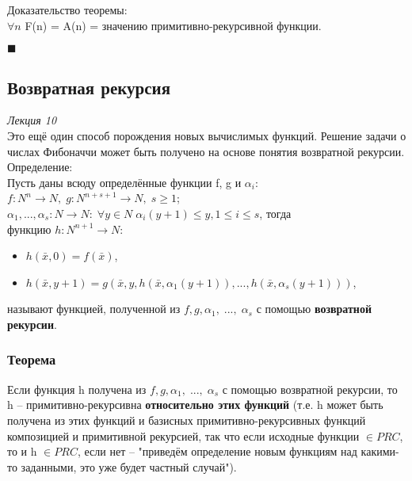         Доказательство теоремы:\\
        $\forall n$ F(n) = A(n) = значению примитивно-рекурсивной функции.
        \begin{flushright}
            $\blacksquare$\\
        \end{flushright}
        
        
    \subsection{Возвратная рекурсия}
    \emph{Лекция 10}\\
    
        Это ещё один способ порождения новых вычислимых функций. Решение задачи о числах Фибоначчи может быть получено на основе понятия возвратной рекурсии.\\
        
        Определение:\\
        Пусть даны всюду определённые функции f, g и $\alpha_{i}$:\\
        $f: N^{n} \rightarrow N,\; g: N^{n+s+1} \rightarrow N,\; s \geq 1$;\\
        $\alpha_1, ... , \alpha_s: N \rightarrow N:\; \forall y \in N \; \alpha_i (y + 1) \leq y, 1 \leq i \leq s$, тогда\\
        функцию $h: N^{n+1} \rightarrow N:$\\
        \begin{itemize}
            \item $h(\bar x, 0) = f(\bar x)$,
            \item $h(\bar x, y + 1) = g(\bar x, y, h(\bar x, \alpha_1(y + 1)), ... , h(\bar x, \alpha_s(y + 1)))$,
        \end{itemize}
        называют функцией, полученной из $f, g, \alpha_1,\; ...,\; \alpha_s$ с помощью \textbf{возвратной рекурсии}.
        
        \subsubsection{Теорема}
            Если функция h получена из $f, g, \alpha_1,\; ...,\; \alpha_s$ с помощью возвратной рекурсии, то h -- примитивно-рекурсивна \textbf{относительно этих функций} (т.е. h может быть получена из этих функций и базисных примитивно-рекурсивных функций композицией и примитивной рекурсией, так что если исходные функции $\in PRC$, то и h $\in PRC$, если нет -- "приведём определение новым функциям над какими-то заданными, это уже будет частный случай").
            
